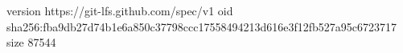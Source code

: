 version https://git-lfs.github.com/spec/v1
oid sha256:fba9db27d74b1e6a850c37798ccc17558494213d616e3f12fb527a95c6723717
size 87544
